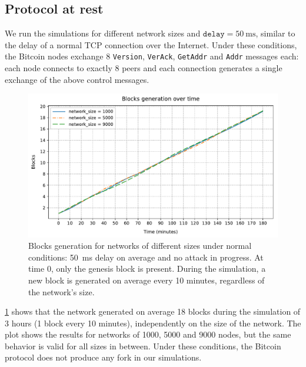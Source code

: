 \subsection{Protocol at rest}
We run the simulations for different network sizes and $\texttt{delay} = \SI{50}{\milli\second}$, similar to the delay of a normal TCP connection over the Internet.
Under these conditions, the Bitcoin nodes exchange $8$ \texttt{Version}, \texttt{VerAck}, \texttt{GetAddr} and \texttt{Addr} messages each:
each node connects to exactly \num{8} peers and each connection generates a single exchange of the above control messages.

\begin{figure}[h!]
	\centering
	\advance \leftskip \myextraleftmargin
	\includegraphics[width=\myplotswitdth \columnwidth]{plots/blocks_rest_linechart}
	\caption[Blocks generation for networks of different sizes]{
		Blocks generation for networks of different sizes under normal conditions:
		\SI{50}{\milli\second} delay on average and no attack in progress.
		At time \num{0}, only the genesis block is present.
		During the simulation, a new block is generated on average every \num{10} minutes, regardless of the network's size.
	}
	\label{fig:blocks-rest-linechart}
\end{figure}

\cref{fig:blocks-rest-linechart} shows that the network generated on average \num{18} blocks during the simulation of \num{3} hours (\num{1} block every \num{10} minutes), independently on the size of the network.
The plot shows the results for networks of \num{1000}, \num{5000} and \num{9000} nodes, but the same behavior is valid for all sizes in between.
Under these conditions, the Bitcoin protocol does not produce any fork in our simulations.

